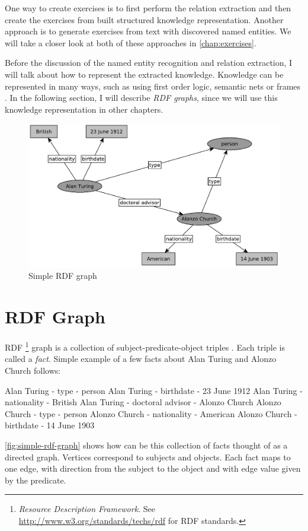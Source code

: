 \documentclass[12pt, twoside]{fithesis2}
\renewcommand{\_}{\leavevmode \kern0.07em\vbox{\hrule width0.4em}}
\begin{document}
One way to create exercises is to first perform the relation extraction and then create the exercises from built structured knowledge representation. Another approach is to generate exercises from text with discovered named entities. We will take a closer look at both of these approaches in \autoref{chap:exercises}.

Before the discussion of the named entity recognition and relation extraction,
I will talk about how to represent the extracted knowledge.
Knowledge can be represented in many ways,
such as using first order logic, semantic nets or frames \cite{knowledge-representation}.
In the following section, I will describe \emph{RDF graphs},
since we will use this knowledge representation in other chapters.

\begin{figure}[h]
  \centering
  \includegraphics[width=\textwidth]{images/rdf-graph.pdf}
  \caption{Simple RDF graph}
  \label{fig:simple-rdf-graph}
\end{figure}

\section{RDF Graph}
\label{sec:rdf-graph}


RDF%
\footnote{\textit{Resource Description Framework}.
See \url{http://www.w3.org/standards/techs/rdf} for RDF standards.}
graph is a collection of subject-predicate-object triples \parencite[][63]{semantic-web}.
Each triple is called a \textit{fact}.
Simple example of a few facts about Alan Turing and Alonzo Church follows:
\begin{code}
Alan Turing - type - person
Alan Turing - birthdate - 23 June 1912
Alan Turing - nationality - British
Alan Turing - doctoral advisor - Alonzo Church
Alonzo Church - type - person
Alonzo Church - nationality - American
Alonzo Church - birthdate - 14 June 1903
\end{code}
\noindent
\autoref{fig:simple-rdf-graph} shows how can be this collection of facts thought of as a directed graph.
Vertices correspond to subjects and objects. Each fact maps to one edge, with direction from the subject to the object and with edge value given by the predicate.
\end{document}
